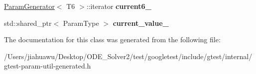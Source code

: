 \begin{DoxyCompactItemize}
\mbox{\hyperlink{classtesting_1_1internal_1_1_param_generator}{Param\+Generator}}$<$ T6 $>$\+::iterator {\bfseries current6\+\_\+}
\item 
\mbox{\label{classtesting_1_1internal_1_1_cartesian_product_generator6_1_1_iterator_ade02778a57fc9bddd4f374af3a1da0b3}} 
std\+::shared\+\_\+ptr$<$ Param\+Type $>$ {\bfseries current\+\_\+value\+\_\+}
\end{DoxyCompactItemize}


The documentation for this class was generated from the following file\+:\begin{DoxyCompactItemize}
\item 
/\+Users/jiahuawu/\+Desktop/\+O\+D\+E\+\_\+\+Solver2/test/googletest/include/gtest/internal/gtest-\/param-\/util-\/generated.\+h\end{DoxyCompactItemize}
